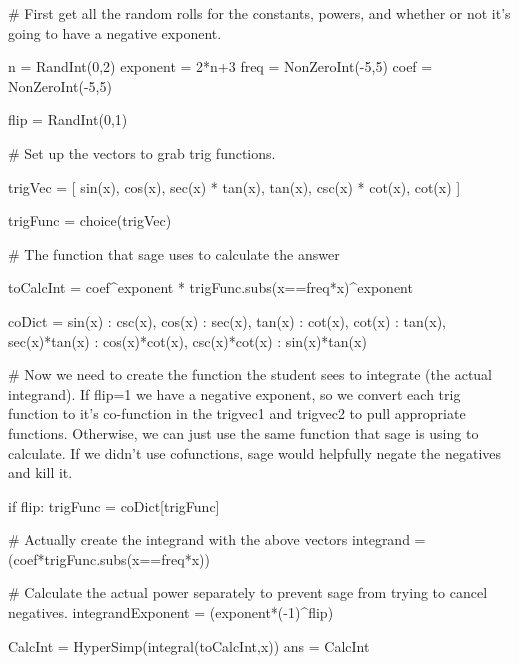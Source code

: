 \begin{sagesilent}
# First get all the random rolls for the constants, powers, and whether or not it's going to have a negative exponent.

n = RandInt(0,2)
exponent = 2*n+3
freq = NonZeroInt(-5,5)
coef = NonZeroInt(-5,5)

flip = RandInt(0,1)

# Set up the vectors to grab trig functions.

trigVec = [
  sin(x), 
  cos(x), 
  sec(x) * tan(x), 
  tan(x), 
  csc(x) * cot(x), 
  cot(x)
]

trigFunc = choice(trigVec)

# The function that sage uses to calculate the answer

toCalcInt = coef^exponent * trigFunc.subs(x==freq*x)^exponent

coDict = {
  sin(x) : csc(x),
  cos(x) : sec(x),
  tan(x) : cot(x),
  cot(x) : tan(x),
  sec(x)*tan(x) : cos(x)*cot(x),
  csc(x)*cot(x) : sin(x)*tan(x)
}

# Now we need to create the function the student sees to integrate (the actual integrand). If flip=1 we have a negative exponent, so we convert each trig function to it's co-function in the trigvec1 and trigvec2 to pull appropriate functions. Otherwise, we can just use the same function that sage is using to calculate. If we didn't use cofunctions, sage would helpfully negate the negatives and kill it.

if flip:
  trigFunc = coDict[trigFunc]

# Actually create the integrand with the above vectors
integrand = (coef*trigFunc.subs(x==freq*x))

# Calculate the actual power separately to prevent sage from trying to cancel negatives.
integrandExponent = (exponent*(-1)^flip)

CalcInt = HyperSimp(integral(toCalcInt,x))
ans = CalcInt

\end{sagesilent}




